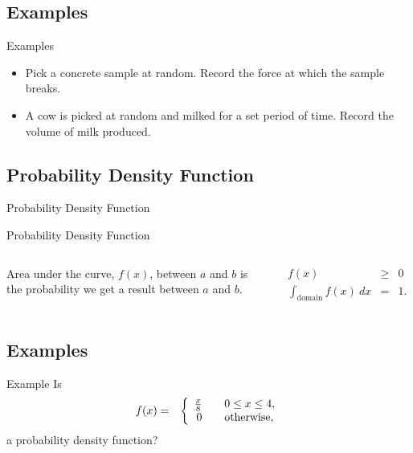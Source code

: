 \subsection{Examples}

\begin{frame}{Examples}

  \begin{itemize}
  \item Pick a concrete sample at random. Record the force at which
    the sample breaks.
  \item A cow is picked at random and milked for a set period of
    time. Record the volume of milk produced.
  \end{itemize}
  
\end{frame}

\subsection{Probability Density Function}

\begin{frame}{Probability Density Function}

  Probability Density Function
  \begin{columns}

    Area under the curve, $f(x)$, between $a$ and $b$ is the
    probability we get a result between $a$ and $b$.

    \begin{eqnarray*}
      f(x) & \geq & 0 \\
      \int_{\mathrm{domain}} f(x) ~ dx & = & 1.
    \end{eqnarray*}

  \end{columns}
  
\end{frame}

\subsection{Examples}

\begin{frame}{Example}
  Is 
  \begin{eqnarray*}
    f(x) & = & \left\{
    \begin{array}{r@{\hspace{2em}}l}
      \frac{x}{8} & 0\leq x \leq 4, \\
      0 & \mathrm{otherwise},
    \end{array}
    \right.
  \end{eqnarray*}
  a probability density function?
\end{frame}

